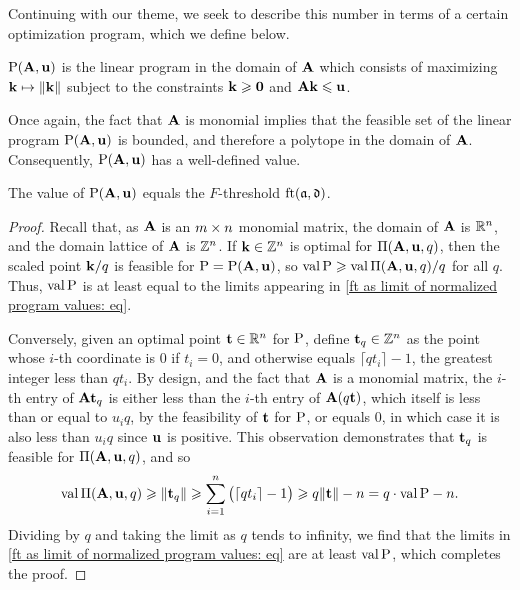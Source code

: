 \documentclass{article}
\begin{document}
Continuing with our theme, we seek to describe this number in terms of a certain optimization program, which we define below.

\begin{definition}
\label{LP: D}
 $\mathrm{P}(\mathbf{A}, \mathbf{u})$ is the linear program in the domain of $\mathbf{A}$ which consists of maximizing $\mathbf{k} \mapsto \| \mathbf{k} \|$ subject to the constraints $\mathbf{k} \geqslant \mathbf{0}$ and $\mathbf{A} \mathbf{k} \leqslant \mathbf{u}$.
\end{definition}

Once again, the fact that $\mathbf{A}$ is monomial implies that the feasible set of the linear program $\mathrm{P}(\mathbf{A},\mathbf{u})$ is bounded, and therefore a polytope in the domain of $\mathbf{A}$.  Consequently, $\mathrm{P}(\mathbf{A},\mathbf{u})$ has a well-defined value.

\begin{proposition}
\label{ft as val LP: P}
The value of $\mathrm{P}(\mathbf{A}, \mathbf{u})$ equals the $F$-threshold $\operatorname{ft}(\mathfrak{a}, \mathfrak{d})$.
\end{proposition}

\begin{proof}
  Recall that, as $\mathbf{A}$ is an $m \times n$ monomial matrix, the domain of $\mathbf{A}$ is $\mathbb{R}^n$, and the domain lattice of $\mathbf{A}$ is $\mathbb{Z}^n$.  If $\mathbf{k} \in \mathbb{Z}^n$ is optimal for $\Pi(\mathbf{A},\mathbf{u},q)$, then the scaled point $\mathbf{k}/q$ is feasible for $\mathrm{P} = \mathrm{P}(\mathbf{A}, \mathbf{u})$, so $\operatorname{val} \mathrm{P} \geqslant \operatorname{val} \Pi(\mathbf{A}, \mathbf{u}, q)/q$ for all $q$.
   Thus, $\operatorname{val} \mathrm{P}$ is at least equal to the limits appearing in \eqref{ft as limit of normalized program values: eq}.

   Conversely, given an optimal point $\mathbf{t} \in \mathbb{R}^n$ for $\mathrm{P}$,
   define $\mathbf{t}_q \in \mathbb{Z}^n$ as the point whose $i$-th coordinate is $0$ if $t_i=0$, and otherwise equals $\lceil q t_i \rceil - 1$, the greatest integer less than $q t_i$.
   By design, and the fact that $\mathbf{A}$ is a monomial matrix, the $i$-th entry of $\mathbf{A} \mathbf{t}_q$ is either less than the $i$-th entry of $\mathbf{A} (q \mathbf{t})$, which itself is less than or equal to $u_iq$, by the feasibility of $\mathbf{t}$ for $\mathrm{P}$, or equals $0$,  in which case it is also less than $u_i q$ since $\mathbf{u}$ is positive. This observation demonstrates that $\mathbf{t}_q$ is feasible for $\Pi(\mathbf{A}, \mathbf{u}, q)$, and so
   \[\operatorname{val} \Pi(\mathbf{A}, \mathbf{u}, q) \geqslant \| \mathbf{t}_q \| \geqslant \sum_{i=1}^n \big(\lceil q t_i \rceil - 1\big) \geqslant q \| \mathbf{t} \| -n = q \cdot \operatorname{val} \mathrm{P} - n.\]
   Dividing by $q$ and taking the limit as $q$ tends to infinity, we find that the limits in \eqref{ft as limit of normalized program values: eq} are at least $\operatorname{val} \mathrm{P}$, which completes the proof.
\end{proof}
\end{document}
